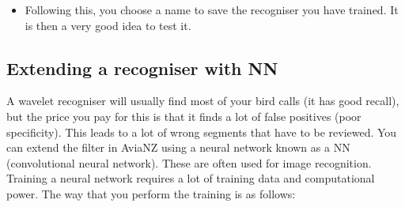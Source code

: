 \documentclass{article}
\begin{document}
\begin{itemize}



\item Following this, you choose a name to save the recogniser you have trained. It is then a very good idea to test it. 
\end{itemize}

\subsection{Extending a recogniser with NN}\label{sec:nnfilter}

A wavelet recogniser will usually find most of your bird calls (it has good recall), but the price you pay for this is that it finds a lot of false positives (poor specificity). This leads to a lot of wrong segments that have to be reviewed. You can extend the filter in AviaNZ using a neural network known as a NN (convolutional neural network). These are often used for image recognition. Training a neural network requires a lot of training data and computational power. The way that you perform the training is as follows:
\end{document}
